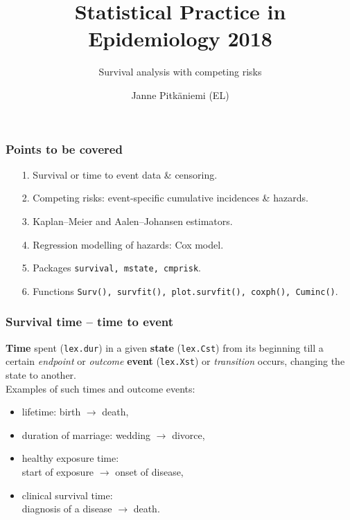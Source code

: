 \documentclass[handout,12pt,dvipsnames,t]{beamer}
\title{Statistical Practice in Epidemiology 2018}
\subtitle{Survival analysis with competing risks} %
\author{Janne Pitk\"aniemi (EL) }
\date{}
\begin{document}


\maketitle


\begin{frame}[fragile]
\frametitle{Points to be covered}

\begin{itemize}
\item[1.] Survival or time to event data \& censoring.
 \medskip
 \item[2.] 
 Competing risks: event-specific cumulative incidences \& hazards.
 \medskip
\item[3.] Kaplan--Meier and Aalen--Johansen estimators.
 \medskip
 \item[4.] 
 Regression modelling of hazards: Cox model.
 \medskip
 \item[5.]
 Packages \texttt{survival, mstate, cmprisk}.
\medskip
\item[6.] 
 Functions \texttt{Surv(), survfit(), plot.survfit(), coxph(), Cuminc()}.
\end{itemize}

\end{frame}


\begin{frame}[fragile]
\frametitle{Survival time -- time to event}

\textbf{Time} spent (\texttt{lex.dur}) in a given \textbf{state} (\texttt{lex.Cst}) from its 
beginning till a certain \textit{endpoint} or \textit{outcome} \textbf{event}  (\texttt{lex.Xst}) or \textit{transition}  occurs, changing the state to another. \\
 

\bigskip
Examples of such times and outcome events:
\begin{itemize}
\item lifetime: birth $\rightarrow$ death,
\medskip
\item duration of marriage: wedding $\to$ divorce, 
\medskip
\item healthy exposure time: \\ start of exposure  
  $\rightarrow$ onset of disease,
  \medskip
\item clinical survival time: \\
 diagnosis of a disease  $\rightarrow$ death.
\end{itemize}


\end{frame}
\end{document}
